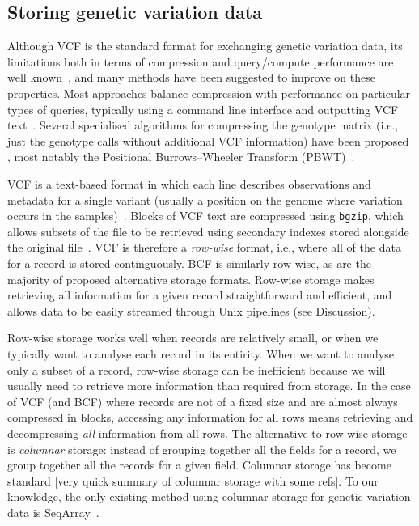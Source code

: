 \documentclass[a4paper,num-refs]{oup-contemporary}
\begin{document}
\subsection{Storing genetic variation data}
Although VCF is the standard format for exchanging genetic variation
data, its limitations both in terms of compression 
and query/compute performance are well 
known~\citep[e.g.][]{kelleher2013processing,layer2016efficient,li2016bgt},
and many methods 
have been suggested to improve on these properties.
Most approaches balance compression with
performance on particular types of queries, 
typically using a command line interface
and outputting VCF text~\citep{
layer2016efficient, %
li2016bgt, %
tatwawadi2016gtrac, %
danek2018gtc, %
lin2020sparse, %
lan2020genozip,lan2021genozip, %
lefaive2021sparse, %
wertenbroek2022xsi,%
zhang2023gbc}. %
Several specialised algorithms for compressing 
the genotype matrix (i.e., just the genotype calls without additional
VCF information) have been proposed
\citep{deorowicz2013genome, %
deorowicz2019gtshark, %
deorowicz2021vcfshark}, %
most notably the Positional
Burrows--Wheeler Transform (PBWT)~\citep{durbin2014efficient}.

VCF is a text-based format in which each line
describes observations
and metadata for a single variant (usually a position on the genome
where variation occurs in the samples)~\citep{danecek2011variant}. 
Blocks of VCF text are compressed using \texttt{bgzip},
which allows subsets of the file to be retrieved using secondary
indexes stored alongside the original file~\citep{li2011tabix}.
VCF is therefore a \emph{row-wise} format, i.e., where all of the 
data for a record is stored continguously. BCF is similarly 
row-wise, as are the majority of proposed alternative storage formats.
Row-wise storage makes retrieving all information
for a given record straightforward and efficient, and 
allows data to be easily streamed through Unix pipelines (see Discussion).

Row-wise storage works well when records are relatively small, 
or when we typically want to analyse each record in its entirity.
When we want to analyse only a subset of a record,
row-wise storage can be inefficient because we will usually need to
retrieve more information than required from storage. In the case 
of VCF (and BCF) where records are not of a fixed size and 
are almost always compressed in blocks, accessing any information
for all rows means retrieving and decompressing \emph{all} 
information from all rows.
The alternative to row-wise storage is \emph{columnar} storage:
instead of grouping together all the fields for a record,
we group together all the records for a given field.
Columnar storage has become standard [very quick summary of columnar
storage with some refs].
To our knowledge, the only existing method using columnar 
storage for genetic variation data is 
SeqArray~\citep{zheng2017seqarray,zheng2012high}.
\end{document}
